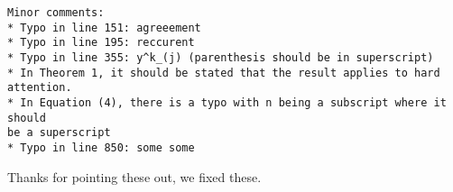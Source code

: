 \documentclass[11pt,a4paper]{article}
\newcommand\response[1]{{\color{blue}#1}}
\begin{document}
\begin{verbatim}
Minor comments:
* Typo in line 151: agreeement
* Typo in line 195: reccurent
* Typo in line 355: y^k_(j) (parenthesis should be in superscript)
* In Theorem 1, it should be stated that the result applies to hard
attention.
* In Equation (4), there is a typo with n being a subscript where it should
be a superscript
* Typo in line 850: some some
\end{verbatim}

\response{Thanks for pointing these out, we fixed these.}
\end{document}
